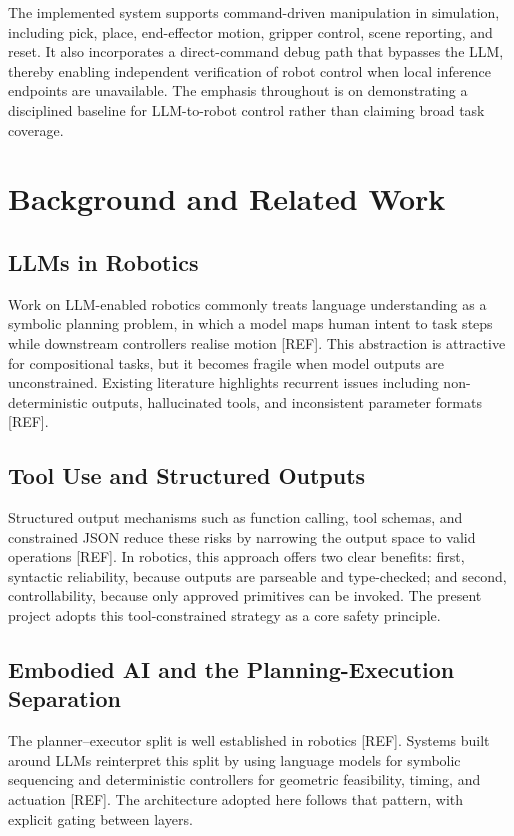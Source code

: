 \documentclass[12pt,a4paper]{article}
\begin{document}
The implemented system supports command-driven manipulation in simulation, including pick, place, end-effector motion, gripper control, scene reporting, and reset. It also incorporates a direct-command debug path that bypasses the LLM, thereby enabling independent verification of robot control when local inference endpoints are unavailable. The emphasis throughout is on demonstrating a disciplined baseline for LLM-to-robot control rather than claiming broad task coverage.

\section{Background and Related Work}

\subsection{LLMs in Robotics}

Work on LLM-enabled robotics commonly treats language understanding as a symbolic planning problem, in which a model maps human intent to task steps while downstream controllers realise motion [REF]. This abstraction is attractive for compositional tasks, but it becomes fragile when model outputs are unconstrained. Existing literature highlights recurrent issues including non-deterministic outputs, hallucinated tools, and inconsistent parameter formats [REF].

\subsection{Tool Use and Structured Outputs}

Structured output mechanisms such as function calling, tool schemas, and constrained JSON reduce these risks by narrowing the output space to valid operations [REF]. In robotics, this approach offers two clear benefits: first, syntactic reliability, because outputs are parseable and type-checked; and second, controllability, because only approved primitives can be invoked. The present project adopts this tool-constrained strategy as a core safety principle.

\subsection{Embodied AI and the Planning-Execution Separation}

The planner--executor split is well established in robotics [REF]. Systems built around LLMs reinterpret this split by using language models for symbolic sequencing and deterministic controllers for geometric feasibility, timing, and actuation [REF]. The architecture adopted here follows that pattern, with explicit gating between layers.
\end{document}
